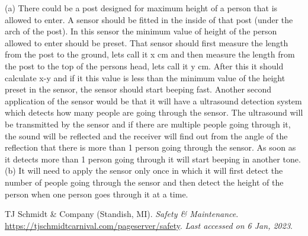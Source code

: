 \documentclass[a4paper]{exam}
\begin{document}
\begin{questions}
\begin{minipage}{.65\linewidth}
\end{minipage}
\begin{solution}
     (a) There could be a post designed for maximum height of a person that is allowed to enter. A sensor should be fitted in the inside of that post (under the arch of the post). In this sensor the minimum value of height of the person allowed to enter should be preset. That sensor should first measure the length from the post to the ground, lets call it x cm and then measure the length from the post to the top of the persons head, lets call it y cm. After this it should calculate x-y and if it this value is less than the minimum value of the height preset in the sensor, the sensor should start beeping fast. Another second application of the sensor would be that it will have a ultrasound detection system which detects how many people are going through the sensor. The ultrasound will be transmitted by the sensor and if there are multiple people going through it, the sound will be reflected and the receiver will find out from the angle of the reflection that there is more than 1 person going through the sensor. As soon as it detects more than 1 person going through it will start beeping in another tone. 
    (b) It will need to apply the sensor only once in which it will first detect the number of people going through the sensor and then detect the height of the person when one person goes through it at a time.
  \end{solution}
\end{questions}

\begin{thebibliography}{9}
  TJ Schmidt \& Company (Standish, MI). \emph{Safety \& Maintenance}. \url{https://tjschmidtcarnival.com/pageserver/safety}. \textit{Last accessed on 6 Jan, 2023}.
\end{thebibliography}
\end{document}

